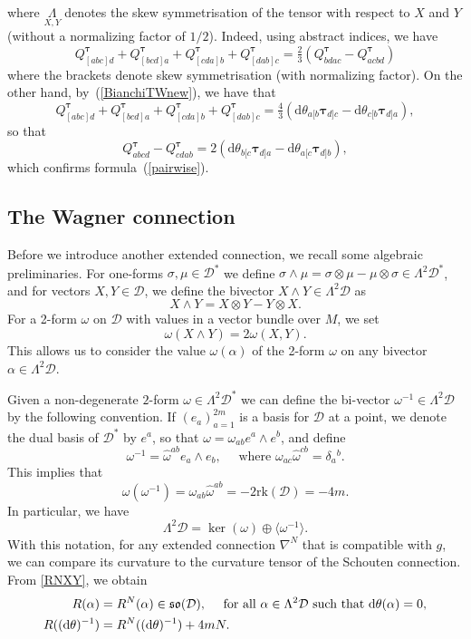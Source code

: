 \documentclass{amsart}
\theoremstyle{plain}
\theoremstyle{definition}
\def\so{\mathfrak{so}}
\newcommand{\bt}{{\boldsymbol{\tau}}}
\newcommand{\1}{\mathbf{1}}
\newcommand{\D}{{\mathcal D}}
\renewcommand{\d}{\mathrm{d}}
\newcommand{\+}{\oplus}
\newcommand{\N}{N}
\newcommand{\tcom}[1]{
 \marginpar{{\scriptsize  T: #1 }}}
\begin{document}
where $\underset{X,Y}{\Lambda}$ denotes the skew symmetrisation of the tensor with respect to $X$ and $Y$ (without a normalizing factor of $1/2$). 
Indeed, using abstract indices, we have
\[
Q^\bt_{[abc]d}
+
Q^\bt_{[bcd]a}
+
Q^\bt_{[cda]b}
+
Q^\bt_{[dab]c}
=\tfrac{2}{3}\left( Q^\bt_{bdac}-Q^\bt_{acbd}\right)
\]
where the brackets denote skew symmetrisation (with normalizing factor).
On the other hand, by~(\ref{BianchiTWnew}), we have that
\[
Q^\bt_{[abc]d}
+
Q^\bt_{[bcd]a}
+
Q^\bt_{[cda]b}
+
Q^\bt_{[dab]c}
=
\tfrac{4}{3}\left( \d\theta_{a[b}\bt_{d]c}-\d\theta_{c[b}\bt_{d]a}\right),
\]
so that
\[
Q^\bt_{abcd}-Q^\bt_{cdab}=2 \left(\d\theta_{b[c}\bt_{d]a}- \d\theta_{a[c}\bt_{d]b}\right)
,\]
 which confirms formula~(\ref{pairwise}).




 
 
 
 \subsection{The Wagner connection}
Before we introduce another extended connection, we recall some algebraic preliminaries.
For one-forms $\sigma, \mu\in \D^*$ we define $\sigma\wedge \mu=\sigma\otimes \mu-\mu\otimes \sigma\in \Lambda^2\D^*$, and 
for vectors $X,Y\in\D$, we define the bivector
$X\wedge Y\in \Lambda^2 \D$ as 
\[X\wedge Y=X\otimes Y-Y\otimes X.\]
For a 2-form 
$\omega$ on $\D$ with values in a vector bundle over $M$, we set $$\omega(X\wedge Y)=2\omega(X,Y).$$
This allows us to consider the value $\omega(\alpha)$ of the 2-form $\omega$ on any bivector $\alpha\in \Lambda^2 \D$.


Given a non-degenerate $2$-form $\omega\in \Lambda^2\D^*$ we can define the bi-vector  $\omega^{-1}\in \Lambda^2\D$ by the following convention. If $(e_a)_{a=1}^{2m}$ is a basis for $\D$ at a point, we denote the dual basis of $\D^* $ by $e^a$, so that $\omega=\omega_{ab}e^a\wedge e^b$, and define 
\[\omega^{-1}=\hat\omega^{ab}e_a\wedge e_b,\quad\text{ where $\omega_{ac}\hat\omega^{cb}=\delta_a{}^b$.} \]
%
This implies that  \[\omega(\omega^{-1})=\omega_{ab}\hat\omega^{ab}=-2\mathrm{rk}(\D)=-4m.\] In particular, we have 
\[\Lambda^2\D=\ker(\omega)\+\langle \omega^{-1}\rangle.\]
With this notation, for any extended connection $\nabla^\N$ that is compatible with  $g$, we can compare its curvature to the  curvature tensor of the Schouten connection. From
 \eqref{RNXY}, we obtain
 \begin{align}R(\alpha)&=R^\N(\alpha)\in \so(\D),\quad  \text{ for all  $\alpha\in \Lambda^2\D$ such that $ \d\theta(\alpha)=0$},\\
 \label{preWagner}
R((\d\theta)^{-1})&=R^\N((\d\theta)^{-1})+4m\N.
\end{align}
\end{document}
